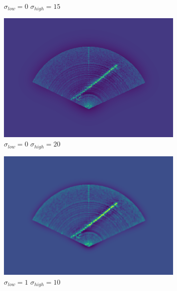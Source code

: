 \begin{figure}[H]
\begin{subfigure}[b]{.32\textwidth}
        \caption{\(\sigma_{low} = 0\) \(\sigma_{high} = 15\)}
    \end{subfigure}
    \hfill
    \begin{subfigure}[b]{.32\textwidth}
        \centering
        \includegraphics[width=\textwidth]{figures/bandpassing/0_20.png}
        \caption{\(\sigma_{low} = 0\) \(\sigma_{high} = 20\)}
    \end{subfigure}
    \hfill
    \begin{subfigure}[b]{.32\textwidth}
        \centering
        \includegraphics[width=\textwidth]{figures/bandpassing/1_10.png}
        \caption{\(\sigma_{low} = 1\) \(\sigma_{high} = 10\)}
    \end{subfigure}
    \hfill
    \begin{subfigure}[b]{.32\textwidth}
        \centering

\end{subfigure}
\end{figure}
